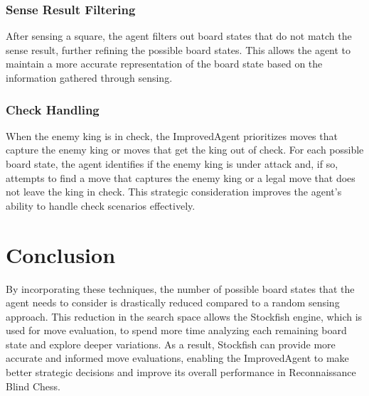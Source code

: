 \documentclass[10pt]{article}
\begin{document}
\subsubsection{Sense Result Filtering}
After sensing a square, the agent filters out board states that do not match the sense result, further refining the possible board states. This allows the agent to maintain a more accurate representation of the board state based on the information gathered through sensing.

\subsubsection{Check Handling}
When the enemy king is in check, the ImprovedAgent prioritizes moves that capture the enemy king or moves that get the king out of check. For each possible board state, the agent identifies if the enemy king is under attack and, if so, attempts to find a move that captures the enemy king or a legal move that does not leave the king in check. This strategic consideration improves the agent's ability to handle check scenarios effectively.

\section{Conclusion}
By incorporating these techniques, the number of possible board states that the agent needs to consider is drastically reduced compared to a random sensing approach. This reduction in the search space allows the Stockfish engine, which is used for move evaluation, to spend more time analyzing each remaining board state and explore deeper variations. As a result, Stockfish can provide more accurate and informed move evaluations, enabling the ImprovedAgent to make better strategic decisions and improve its overall performance in Reconnaissance Blind Chess.


    
  
\end{document}
